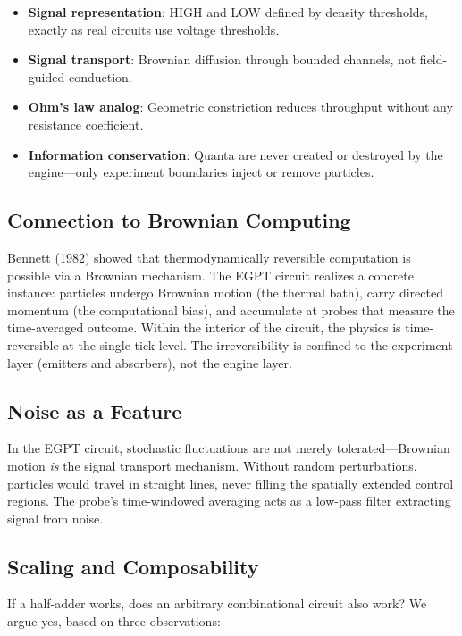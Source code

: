 \documentclass[11pt,a4paper]{article}
\begin{document}
\begin{itemize}
    \item \textbf{Signal representation}: HIGH and LOW defined by density thresholds, exactly as real circuits use voltage thresholds.
    \item \textbf{Signal transport}: Brownian diffusion through bounded channels, not field-guided conduction.
    \item \textbf{Ohm's law analog}: Geometric constriction reduces throughput without any resistance coefficient.
    \item \textbf{Information conservation}: Quanta are never created or destroyed by the engine---only experiment boundaries inject or remove particles.
\end{itemize}

\subsection{Connection to Brownian Computing}

Bennett (1982) showed that thermodynamically reversible computation is possible via a Brownian mechanism. The EGPT circuit realizes a concrete instance: particles undergo Brownian motion (the thermal bath), carry directed momentum (the computational bias), and accumulate at probes that measure the time-averaged outcome. Within the interior of the circuit, the physics is time-reversible at the single-tick level. The irreversibility is confined to the experiment layer (emitters and absorbers), not the engine layer.

\subsection{Noise as a Feature}

In the EGPT circuit, stochastic fluctuations are not merely tolerated---Brownian motion \emph{is} the signal transport mechanism. Without random perturbations, particles would travel in straight lines, never filling the spatially extended control regions. The probe's time-windowed averaging acts as a low-pass filter extracting signal from noise.

\subsection{Scaling and Composability}
\label{subsec:scaling}

If a half-adder works, does an arbitrary combinational circuit also work? We argue yes, based on three observations:
\end{document}
